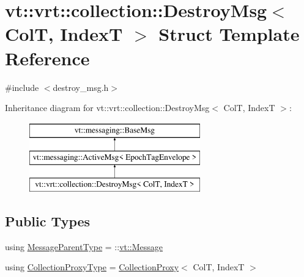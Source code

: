 \hypertarget{structvt_1_1vrt_1_1collection_1_1_destroy_msg}{}\section{vt\+:\+:vrt\+:\+:collection\+:\+:Destroy\+Msg$<$ ColT, IndexT $>$ Struct Template Reference}
\label{structvt_1_1vrt_1_1collection_1_1_destroy_msg}


{\ttfamily \#include $<$destroy\+\_\+msg.\+h$>$}

Inheritance diagram for vt\+:\+:vrt\+:\+:collection\+:\+:Destroy\+Msg$<$ ColT, IndexT $>$\+:\begin{figure}[H]
\begin{center}
\leavevmode
\includegraphics[height=3.000000cm]{structvt_1_1vrt_1_1collection_1_1_destroy_msg}
\end{center}
\end{figure}
\subsection*{Public Types}
\begin{DoxyCompactItemize}
\item 
using \hyperlink{structvt_1_1vrt_1_1collection_1_1_destroy_msg_a18f035465f85a59ba6aea71a3829b500}{Message\+Parent\+Type} = \+::\hyperlink{namespacevt_a3a3ddfef40b4c90915fa43cdd5f129ea}{vt\+::\+Message}
\item 
using \hyperlink{structvt_1_1vrt_1_1collection_1_1_destroy_msg_a5bf089cacadf94e55e9ae797c4cd0462}{Collection\+Proxy\+Type} = \hyperlink{structvt_1_1vrt_1_1collection_1_1_collection_proxy}{Collection\+Proxy}$<$ ColT, IndexT $>$
\end{DoxyCompactItemize}
